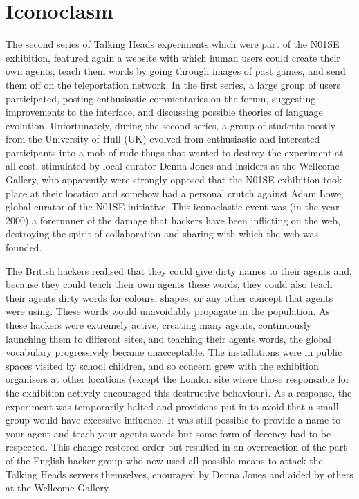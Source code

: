 \section{Iconoclasm} 

The second series of Talking Heads experiments which were part of the N01SE exhibition,
featured again a website with which human users could create their own 
agents, teach them words by going through images of past games, and send them off on the teleportation network.
In the first series, a
large group of users participated, posting enthusiastic commentaries on the forum, suggesting improvements 
to the interface, and discussing possible theories of language evolution. Unfortunately, during the second 
series, a group of students mostly from the University of Hull (UK) evolved from enthusiastic and interested 
participants into a mob of rude thugs that wanted to destroy the experiment at all cost, stimulated by 
local curator Denna Jones and insiders at the Wellcome Gallery, who apparently were strongly opposed 
that the N01SE exhibition took place 
at their location and somehow had a personal crutch against Adam Lowe, global curator of the N01SE initiative. 
This iconoclastic event was (in the year 2000) a forerunner of the damage that 
hackers have been inflicting on the web, destroying the spirit of collaboration and 
sharing with which the web was founded. 

The British hackers realised that they could give dirty names to their agents and, because they 
could teach their own agents these words, they could also teach their agents dirty words for colours, 
shapes, or any other concept that agents were using. These words would unavoidably propagate in the population. 
As these hackers were extremely active, creating many agents, continuously launching them to different sites, and teaching 
their agents words, the global vocabulary progressively became unacceptable. 
The installations were in public spaces visited by school children, and so concern grew with the exhibition organisers
at other locations (except the London site where those responsable for the exhibition
actively encouraged this destructive behaviour). 
As a response, the experiment was temporarily halted and provisions put in to avoid that a small group would have 
excessive influence. It was still possible to provide a name to your agent and teach your agents words but 
some form of decency had to be respected. This change restored order but resulted in an overreaction of the part of 
the English hacker group who now used all possible means to attack the Talking Heads servers themselves, 
enouraged by Denna Jones and aided by others at the Wellcome Gallery. 

